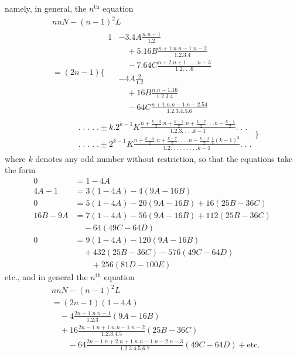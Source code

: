 namely, in general, the \(n^{\mathrm{th}}\) equation
\[
\begin{aligned}
&nnN-(n-1)^2L\\[6pt]
&=(2n-1)\Biggl\{\begin{aligned}
1&-3.4A\frac{n. n-1}{1.2}
\\&\quad+5.16B\frac{n+1. n. n-1. n-2}{1.2.3.4}
\\&\quad-7.64C\frac{n+2. n+1.\;.\;.\;. n-3}{1.2.\;.\;.6}\\[6pt]
&-4A\frac{2}{1.2}
\\&\quad+16B\frac{n. n-1.16}{1.2.3.4}
\\&\quad-64C\frac{n+1. n. n-1. n-2.54}{1.2.3.4.5.6}
\end{aligned}\\[6pt]
&\qquad\begin{aligned}
&.\;.\;.\;.\;.\pm k.2^{k-1}K
\frac{n+\frac{k-3}{2}. n+\frac{k-5}{2}. n+\frac{k-7}{2}.\;.\;. n-\frac{k-1}{2}}
{1.2.3.\;.\;.\;. k-1}.\;.\;.\\[6pt]
&.\;.\;.\;.\;.\pm 2^{k-1}K
\frac{n+\frac{k-5}{2}. n+\frac{k-7}{2}.\;.\;.\;. n-\frac{k-3}{2}.\frac14(k-1)^3}
{1.2.\;.\;.\;.\;.\;.\;.\;.\;. k-1}.\;.\;.
\end{aligned}\Biggr\}
\end{aligned}
\]
where \(k\) denotes any odd number without restriction, so that the equations take the form
\[
\begin{aligned}
0&=1-4A\\[6pt]
4A-1&=3(1-4A)-4(9A-16B)\\[6pt]
0&=5(1-4A)-20(9A-16B)+16(25B-36C)\\[6pt]
16B-9A&=7(1-4A)-56(9A-16B)+112(25B-36C)\\&\quad-64(49C-64D)\\[6pt]
0&=9(1-4A)-120(9A-16B)\\&\quad+432(25B-36C)-576(49C-64D)\\[6pt]
&\qquad+256(81D-100E)
\end{aligned}
\]
etc., and in general the \(n^{\mathrm{th}}\) equation
\[
\begin{aligned}
&nnN-(n-1)^2L\\[6pt]
&=(2n-1)(1-4A)\\&\quad-4\frac{2n-1. n. n-1}{1.2.3}(9A-16B)\\&\quad+16\frac{2n-1. n+1. n. n-1. n-2}{1.2.3.4.5}(25B-36C)\\[6pt]
&\qquad-64\frac{2n-1. n+2. n+1. n. n-1. n-2. n-3}{1.2.3.4.5.6.7}(49C-64D)+\text{etc.}
\end{aligned}
\]
